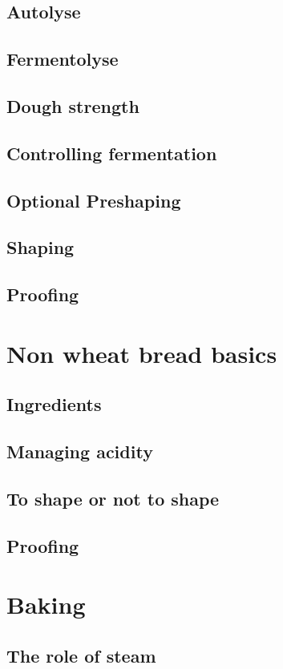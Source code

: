 \documentclass[a4paper, 12pt]{book}
\begin{document}
\section{Autolyse}
\section{Fermentolyse}
\section{Dough strength}
\section{Controlling fermentation}
\section{Optional Preshaping}
\section{Shaping}
\section{Proofing}

\chapter{Non wheat bread basics}
\section{Ingredients}
\section{Managing acidity}
\section{To shape or not to shape}
\section{Proofing}

\chapter{Baking}
\section{The role of steam}
\end{document}
